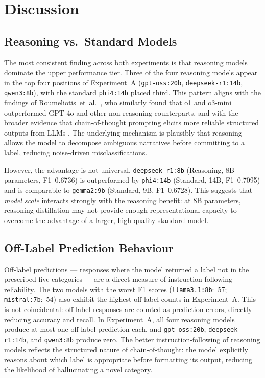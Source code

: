 \documentclass[journal]{IEEEtran}
\begin{document}
\section{Discussion}
\label{sec:discussion}

\subsection{Reasoning vs.\ Standard Models}

The most consistent finding across both experiments is that reasoning
models dominate the upper performance tier.
Three of the four reasoning models appear in the top four positions of
Experiment~A (\texttt{gpt-oss:20b}, \texttt{deepseek-r1:14b},
\texttt{qwen3:8b}), with the standard \texttt{phi4:14b} placed third. This pattern aligns with the findings of
Roumeliotis~et~al.\ \cite{roumeliotis2025think}, who similarly found
that o1 and o3-mini outperformed GPT-4o and other non-reasoning
counterparts, and with the broader evidence that chain-of-thought
prompting elicits more reliable structured outputs from LLMs
\cite{wei2022chainofthought,guo2025deepseekr1}. The underlying
mechanism is plausibly that reasoning allows the model to decompose
ambiguous narratives before committing to a label, reducing
noise-driven misclassifications.

However, the advantage is not universal. \texttt{deepseek-r1:8b}
(Reasoning, 8B parameters, F1~0.6736) is outperformed by
\texttt{phi4:14b} (Standard, 14B, F1~0.7095) and is comparable to
\texttt{gemma2:9b} (Standard, 9B, F1~0.6728). This suggests that
\emph{model scale} interacts strongly with the reasoning benefit:
at 8B parameters, reasoning distillation may not provide enough
representational capacity to overcome the advantage of a larger,
high-quality standard model.

\subsection{Off-Label Prediction Behaviour}

Off-label predictions — responses where the model returned a label
not in the prescribed five categories — are a direct measure of
instruction-following reliability. The two models with the worst
F1 scores (\texttt{llama3.1:8b}:~57; \texttt{mistral:7b}:~54)
also exhibit the highest off-label counts in Experiment~A. This is
not coincidental: off-label responses are counted as prediction
errors, directly reducing accuracy and recall. In Experiment~A, all four
reasoning models produce at most one off-label prediction each, and
\texttt{gpt-oss:20b}, \texttt{deepseek-r1:14b}, and
\texttt{qwen3:8b} produce zero.
The better instruction-following of reasoning models reflects the
structured nature of chain-of-thought: the model explicitly reasons
about which label is appropriate before formatting its output,
reducing the likelihood of hallucinating a novel category.
\end{document}
